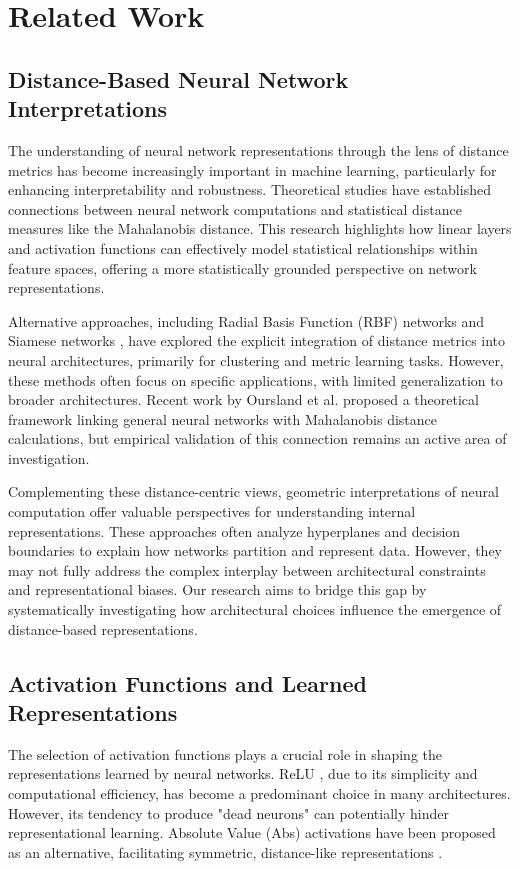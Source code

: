 \section{Related Work}

\subsection{Distance-Based Neural Network Interpretations}
The understanding of neural network representations through the lens of distance metrics has become increasingly important in machine learning, particularly for enhancing interpretability and robustness. Theoretical studies have established connections between neural network computations and statistical distance measures like the Mahalanobis distance. This research highlights how linear layers and activation functions can effectively model statistical relationships within feature spaces, offering a more statistically grounded perspective on network representations.

Alternative approaches, including Radial Basis Function (RBF) networks \cite{broomhead1988rbf} and Siamese networks \cite{bromley1994signature}, have explored the explicit integration of distance metrics into neural architectures, primarily for clustering and metric learning tasks. However, these methods often focus on specific applications, with limited generalization to broader architectures. Recent work by Oursland et al. \cite{oursland2024interpreting} proposed a theoretical framework linking general neural networks with Mahalanobis distance calculations, but empirical validation of this connection remains an active area of investigation.

Complementing these distance-centric views, geometric interpretations of neural computation offer valuable perspectives for understanding internal representations. These approaches often analyze hyperplanes and decision boundaries to explain how networks partition and represent data. However, they may not fully address the complex interplay between architectural constraints and representational biases. Our research aims to bridge this gap by systematically investigating how architectural choices influence the emergence of distance-based representations.

\subsection{Activation Functions and Learned Representations}
The selection of activation functions plays a crucial role in shaping the representations learned by neural networks. ReLU \cite{nair2010relu}, due to its simplicity and computational efficiency, has become a predominant choice in many architectures. However, its tendency to produce "dead neurons" can potentially hinder representational learning. Absolute Value (Abs) activations have been proposed as an alternative, facilitating symmetric, distance-like representations \cite{oursland2024interpreting}.

